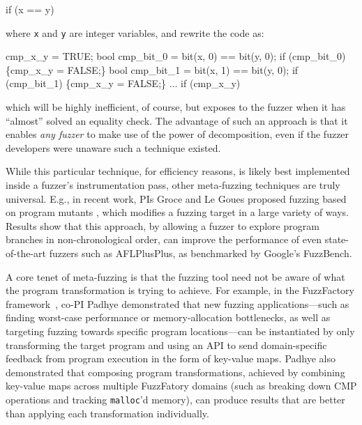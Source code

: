 \documentclass[numbers]{proposalnsf}
\begin{document}
\begin{code}

if (x == y)
\end{code}

\noindent where {\tt x} and {\tt y} are integer variables, and rewrite the code as:

\begin{code}
cmp\_x\_y = TRUE;
bool cmp\_bit\_0 = bit(x, 0) == bit(y, 0);
if (cmp\_bit\_0) \{cmp\_x\_y = FALSE;\}
bool cmp\_bit\_1 = bit(x, 1) == bit(y, 0);
if (cmp\_bit\_1) \{cmp\_x\_y = FALSE;\}
$\ldots$
if (cmp\_x\_y)
\end{code}

\noindent which will be highly inefficient, of course, but exposes to the fuzzer when it has ``almost'' solved an equality check.  The advantage of such an approach is that it enables \emph{any fuzzer} to make use of the power of decomposition, even if the fuzzer developers were unaware such a technique existed.

While this particular technique, for efficiency reasons, is likely best implemented inside a fuzzer's instrumentation pass, other meta-fuzzing techniques are truly universal.  E.g., in recent work, PIs Groce and Le Goues proposed fuzzing based on program mutants \cite{}, which modifies a fuzzing target in a large variety of ways.  Results show that this approach, by allowing a fuzzer to explore program branches in non-chronological order, can improve the performance of even state-of-the-art fuzzers such as AFLPlusPlus, as benchmarked by Google's FuzzBench.

A core tenet of meta-fuzzing is that the fuzzing tool need not be aware of what the program transformation is trying to achieve. For example, in the FuzzFactory framework~\cite{fuzzfactory}, co-PI Padhye demonstrated that new fuzzing applications---such as finding worst-case performance or memory-allocation bottlenecks, as well as targeting fuzzing towards specific program locations---can be instantiated by only transforming the target program and using an API to send domain-specific feedback from program execution in the form of key-value maps. Padhye also demonstrated that composing program transformations, achieved by combining key-value maps across multiple FuzzFatory domains (such as breaking down CMP operations and tracking \texttt{malloc}'d memory), can produce results that are better than applying each transformation individually.
\end{document}
